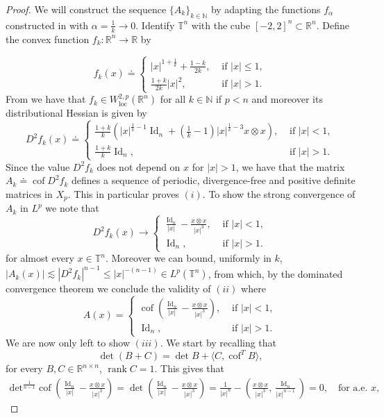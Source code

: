 \documentclass[10pt,reqno]{amsart}
\numberwithin{equation}{section}
\newcommand{\R}{\mathbb{R}}
\newcommand{\T}{\mathbb{T}}
\newcommand{\N}{\mathbb{N}}
\DeclareMathOperator{\cof}{cof}
\DeclareMathOperator{\rank}{rank}
\DeclareMathOperator{\Id}{Id}
\DeclareMathOperator{\loc}{loc}
\theoremstyle{plain}
\theoremstyle{definition}
\theoremstyle{remark}
\begin{document}
\begin{proof}
We will construct the sequence $\{A_k\}_{k\in \N}$ by adapting the functions $f_\alpha$ constructed in \cite[Lemma 3]{DRT} with $\alpha=\frac{1}{k}\rightarrow 0$. Identify $\T^n$ with the cube $[-2,2]^n\subset \R^n$. Define the convex function $f_k:\R^n\rightarrow \R$ by

\[
f_k(x)\doteq
\begin{cases}
|x|^{1 + \frac{1}{k}} + \frac{1-k}{2k}, &\text{ if } |x| \le 1,\\
\frac{1+k}{2k}|x|^2, &\text{ if } |x| > 1.
\end{cases}
\]
From \cite[Lemma 4]{DRT} we have that $f_k\in W^{2,p}_{\loc}(\R^n)$ for all $k\in \N$ if $p<n$ and moreover its distributional Hessian is given by 
$$
D^2f_k(x)\doteq
\begin{cases}
\frac{1+k}{k}\left(|x|^{\frac{1}{k} - 1}\Id_n + (\frac{1}{k} - 1)|x|^{\frac{1}{k} -3}x\otimes x\right), &\text{ if } |x| < 1,\\
 \frac{1+k}{k}\Id_n, &\text{ if }|x| > 1.
\end{cases}
$$
Since the value $D^2f_k$ does not depend on $x$ for $|x| > 1$, we have that the matrix $A_k\doteq\cof D^2f_k$ defines a sequence of periodic, divergence-free and positive definite matrices in $X_p$. This in particular proves $(i)$. To show the strong convergence of $A_k$ in $L^p$ we note that 
$$
D^2f_k(x)\rightarrow
\begin{cases}
\frac{\Id_n }{|x|}-\frac{x\otimes x}{|x|^3}, &\text{ if } |x| < 1,\\
 \Id_n, &\text{ if } |x| > 1.
\end{cases}
$$
for almost every $x\in \T^n$. Moreover we can bound, uniformly in $k$, $|A_k(x)|\lesssim |D^2f_k|^{n-1} \leq |x|^{-(n-1)}\in L^p(\T^n)$, from which, by the dominated convergence theorem we conclude the validity of $(ii)$ where 
$$
A(x)=
\begin{cases}
\cof \left( \frac{\Id_n }{|x|}-\frac{x\otimes x}{|x|^3}\right), &\text{ if } |x|< 1,\\
 \Id_n, &\text{ if } |x| > 1.
\end{cases}
$$
We are now only left to show $(iii)$. We start by recalling that 
\begin{equation}\label{matrix_determinant_lemma}
\det (B+C)=\det B +\langle C, \cof^T B\rangle,
\end{equation}
for every $B,C\in \R^{n\times n}$, $\rank C=1$. This gives that 
\begin{align*}
\text{det}^{\frac{1}{n-1}} \cof  \left( \frac{\Id_n }{|x|}-\frac{x\otimes x}{|x|^3}\right)=\det \left( \frac{\Id_n }{|x|}-\frac{x\otimes x}{|x|^3}\right)=\frac{1}{|x|^n}-\left( \frac{x\otimes x}{|x|^3}, \frac{\Id_n}{|x|^{n-1}}\right)=0,\quad \text{for a.e.  } x,

\end{align*}
\end{proof}
\end{document}
